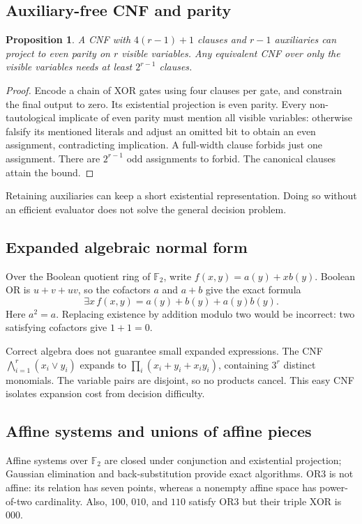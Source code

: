 \documentclass[11pt]{article}
\newtheorem{proposition}[theorem]{Proposition}
\begin{document}
\subsection{Auxiliary-free CNF and parity}
\begin{proposition}\label{prop:parity}
A CNF with $4(r-1)+1$ clauses and $r-1$ auxiliaries can project to even
parity on $r$ visible variables. Any equivalent CNF over only the visible
variables needs at least $2^{r-1}$ clauses.
\end{proposition}
\begin{proof}
Encode a chain of XOR gates using four clauses per gate, and constrain
the final output to zero. Its existential projection is even parity.
Every non-tautological implicate of even parity must mention all visible
variables: otherwise falsify its mentioned literals and adjust an omitted
bit to obtain an even assignment, contradicting implication.
A full-width clause forbids just one assignment. There are $2^{r-1}$
odd assignments to forbid. The canonical clauses attain the bound.
\end{proof}
Retaining auxiliaries can keep a short existential representation.
Doing so without an efficient evaluator does not solve the general
decision problem.

\subsection{Expanded algebraic normal form}
Over the Boolean quotient ring of $\mathbb F_2$, write
$f(x,y)=a(y)+xb(y)$. Boolean OR is $u+v+uv$, so the cofactors $a$ and
$a+b$ give the exact formula
\begin{equation}\label{eq:anf}
\exists x\,f(x,y)=a(y)+b(y)+a(y)b(y).
\end{equation}
Here $a^2=a$. Replacing existence by addition modulo two would be
incorrect: two satisfying cofactors give $1+1=0$.

Correct algebra does not guarantee small expanded expressions.
The CNF $\bigwedge_{i=1}^r(x_i\lor y_i)$ expands to
$\prod_i(x_i+y_i+x_iy_i)$, containing $3^r$ distinct monomials.
The variable pairs are disjoint, so no products cancel.
This easy CNF isolates expansion cost from decision difficulty.

\subsection{Affine systems and unions of affine pieces}
Affine systems over $\mathbb F_2$ are closed under conjunction and
existential projection; Gaussian elimination and back-substitution
provide exact algorithms. OR3 is not affine: its relation has seven
points, whereas a nonempty affine space has power-of-two cardinality.
Also, $100$, $010$, and $110$ satisfy OR3 but their triple XOR is $000$.
\end{document}
